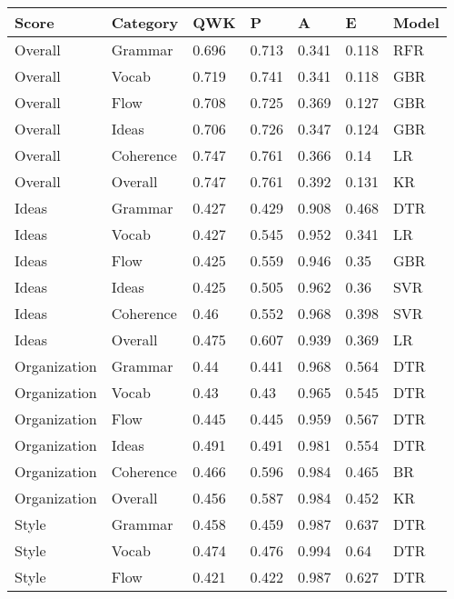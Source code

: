 \begin{table}[h]
\centering
\begin{tabular}{@{}lllllll@{}}
\toprule
Score        & Category  & QWK   & P     & A     & E     & Model \\ \midrule
Overall      & Grammar   & 0.696 & 0.713 & 0.341 & 0.118 & RFR   \\
Overall      & Vocab     & 0.719 & 0.741 & 0.341 & 0.118 & GBR   \\
Overall      & Flow      & 0.708 & 0.725 & 0.369 & 0.127 & GBR   \\
Overall      & Ideas     & 0.706 & 0.726 & 0.347 & 0.124 & GBR   \\
Overall      & Coherence & 0.747 & 0.761 & 0.366 & 0.14  & LR    \\
Overall      & Overall   & 0.747 & 0.761 & 0.392 & 0.131 & KR    \\
Ideas        & Grammar   & 0.427 & 0.429 & 0.908 & 0.468 & DTR   \\
Ideas        & Vocab     & 0.427 & 0.545 & 0.952 & 0.341 & LR    \\
Ideas        & Flow      & 0.425 & 0.559 & 0.946 & 0.35  & GBR   \\
Ideas        & Ideas     & 0.425 & 0.505 & 0.962 & 0.36  & SVR   \\
Ideas        & Coherence & 0.46  & 0.552 & 0.968 & 0.398 & SVR   \\
Ideas        & Overall   & 0.475 & 0.607 & 0.939 & 0.369 & LR    \\
Organization & Grammar   & 0.44  & 0.441 & 0.968 & 0.564 & DTR   \\
Organization & Vocab     & 0.43  & 0.43  & 0.965 & 0.545 & DTR   \\
Organization & Flow      & 0.445 & 0.445 & 0.959 & 0.567 & DTR   \\
Organization & Ideas     & 0.491 & 0.491 & 0.981 & 0.554 & DTR   \\
Organization & Coherence & 0.466 & 0.596 & 0.984 & 0.465 & BR    \\
Organization & Overall   & 0.456 & 0.587 & 0.984 & 0.452 & KR    \\
Style        & Grammar   & 0.458 & 0.459 & 0.987 & 0.637 & DTR   \\
Style        & Vocab     & 0.474 & 0.476 & 0.994 & 0.64  & DTR   \\
Style        & Flow      & 0.421 & 0.422 & 0.987 & 0.627 & DTR   \\

\end{tabular}
\end{table}
